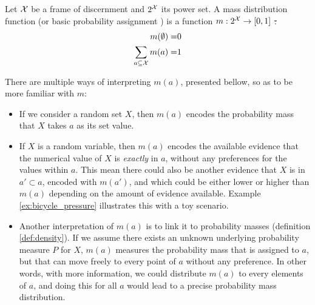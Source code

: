 \begin{definition}\label{def:mass_distribution_function}
    Let $\mathcal{X}$ be a frame of discernment and $2^{\mathcal{X}}$ its power set. A mass distribution function (or basic probability assignment \cite{shafer_mathematical_1976}) is a function $m:2^{\mathcal{X}}\rightarrow[0,1]$ \st:
    \begin{align}
        m(\emptyset) =& 0\label{eq:mass_emptyset}\\
        \sum_{a\subseteq\mathcal{X}}m(a) =& 1\label{eq:mass_whole_set}
    \end{align}
\end{definition}

There are multiple ways of interpreting $m(a)$, presented bellow, so as to be more familiar with $m$:
\begin{itemize}
    \item If we consider a random set $X$, then $m(a)$ encodes the probability mass that $X$ takes $a$ as its set value.
    \item If $X$ is a random variable, then $m(a)$ encodes the available evidence that the numerical value of $X$ is \textit{exactly} in $a$, without any preferences for the values within $a$. This mean there could also be another evidence that $X$ is in $a'\subset a$, encoded with $m(a')$, and which could be either lower or higher than $m(a)$ depending on the amount of evidence available. Example \ref{ex:bicycle_pressure} illustrates this with a toy scenario. 
    \item Another interpretation of $m(a)$ is to link it to probability masses (definition \ref{def:density}). If we assume there exists an unknown underlying probability measure $P$ for $X$, $m(a)$ measures the probability mass that is assigned to $a$, but that can move freely to every point of $a$ without any preference. In other words, with more information, we could distribute $m(a)$ to every elements of $a$, and doing this for all $a$ would lead to a precise probability mass distribution.
\end{itemize}

